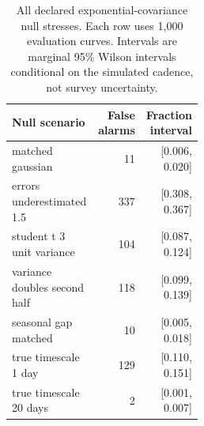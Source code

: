 \begin{table}[ht]
\centering
\caption{All declared exponential-covariance null stresses. Each row uses 1,000 evaluation curves. Intervals are marginal 95\% Wilson intervals conditional on the simulated cadence, not survey uncertainty.}
\label{tab:noise-stress}
\begin{tabular}{p{0.48\linewidth}rr}
\toprule
Null scenario & False alarms & Fraction interval \\
\midrule
matched gaussian & 11 & [0.006, 0.020] \\
errors underestimated 1.5 & 337 & [0.308, 0.367] \\
student t 3 unit variance & 104 & [0.087, 0.124] \\
variance doubles second half & 118 & [0.099, 0.139] \\
seasonal gap matched & 10 & [0.005, 0.018] \\
true timescale 1 day & 129 & [0.110, 0.151] \\
true timescale 20 days & 2 & [0.001, 0.007] \\
\bottomrule
\end{tabular}
\end{table}
